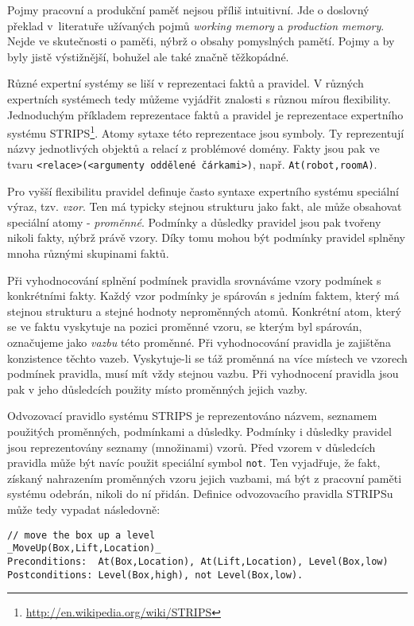 Pojmy pracovní a produkční paměť nejsou příliš intuitivní. Jde o doslovný
překlad v~literatuře užívaných pojmů \emph{working memory} a \emph{production
memory}. Nejde ve skutečnosti o paměťi, nýbrž o obsahy pomyslných pamětí. Pojmy
 a  by byly jistě
výstižnější, bohužel ale také značně těžkopádné.

Různé expertní systémy se liší v reprezentaci faktů a pravidel. V různých
expertních systémech tedy můžeme vyjádřit znalosti s různou mírou flexibility.
Jednoduchým příkladem reprezentace faktů a pravidel je reprezentace expertního
systému STRIPS\footnote{\url{http://en.wikipedia.org/wiki/STRIPS}}. Atomy sytaxe
této reprezentace jsou symboly. Ty reprezentují názvy jednotlivých objektů a
relací z problémové domény. Fakty jsou pak ve tvaru
\verb|<relace>(<argumenty oddělené čárkami>)|, např. \verb|At(robot,roomA)|.

Pro vyšší flexibilitu pravidel definuje často syntaxe expertního systému
speciální výraz, tzv. \emph{vzor}. Ten má typicky stejnou strukturu jako fakt,
ale může obsahovat speciální atomy - \emph{proměnné}. Podmínky a důsledky
pravidel jsou pak tvořeny nikoli fakty, nýbrž právě vzory. Díky tomu mohou být
podmínky pravidel splněny mnoha různými skupinami faktů.

Při vyhodnocování splnění podmínek pravidla srovnáváme vzory podmínek s
konkrétními fakty. Každý vzor podmínky je spárován s jedním faktem, který má
stejnou strukturu a stejné hodnoty neproměnných atomů. Konkrétní atom, který se
ve faktu vyskytuje na pozici proměnné vzoru, se kterým byl spárován, označujeme
jako \emph{vazbu} této proměnné. Při vyhodnocování pravidla je zajištěna
konzistence těchto vazeb. Vyskytuje-li se táž proměnná na více místech ve
vzorech podmínek pravidla, musí mít vždy stejnou vazbu. Při vyhodnocení pravidla
jsou pak v jeho důsledcích použity místo proměnných jejich vazby.

Odvozovací pravidlo systému STRIPS je reprezentováno názvem, seznamem použitých
proměnných, podmínkami a důsledky. Podmínky i důsledky pravidel jsou
reprezentovány seznamy (množinami) vzorů. Před vzorem v důsledcích pravidla může
být navíc použit speciální symbol \verb|not|. Ten vyjadřuje, že fakt, získaný
nahrazením proměnných vzoru jejich vazbami, má být z pracovní paměti systému
odebrán, nikoli do ní přidán.  Definice odvozovacího pravidla STRIPSu může tedy
vypadat následovně:
\begin{verbatim}
// move the box up a level
_MoveUp(Box,Lift,Location)_
Preconditions:  At(Box,Location), At(Lift,Location), Level(Box,low)
Postconditions: Level(Box,high), not Level(Box,low).
\end{verbatim}

